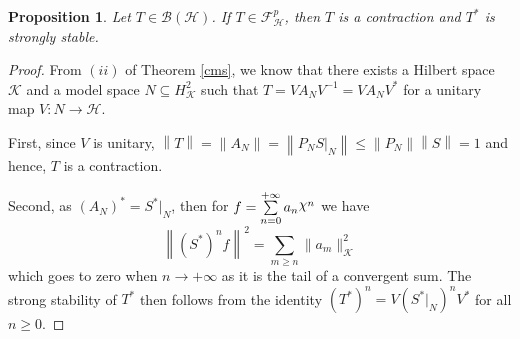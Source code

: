 \documentclass[a4paper,12pt]{amsart}
\def\cF{{\mathcal{F}}}
\def\HH{{\mathcal{H}}}
\def\KK{{\mathcal{K}}}
\def\cF{{\mathcal{F}}}
\DeclareRobustCommand{\rchi}{{\mathpalette\irchi\relax}}
\newcommand{\irchi}[2]{\raisebox{\depth}{$#1\chi$}} %
\newcommand{\norm}[1]{{\left\|{#1}\right\|}}
\newtheorem{proposition}[theorem]{Proposition}
\theoremstyle{definition}
\begin{document}
\begin{proposition}\label{prop:parseval-ida}
Let $T\in\mathcal B(\mathcal H)$. If $T\in\cF^{p}_\HH$, then $T$ is a contraction and $T^*$ is strongly stable.
\end{proposition}
\begin{proof}
 From $(ii)$ of Theorem \ref{cms}, we know that there exists a Hilbert space $\KK$ and a model space $N\subseteq H^2_\KK$ such that $T=VA_NV^{-1}=VA_NV^*$ for a unitary map $V:N\to\HH$. 

First, since $V$ is unitary, $\norm{T}=\norm{A_N}=\norm{P_NS|_N}\leqslant\norm{P_N}\norm{S} = 1$ and hence, $T$ is a contraction. 

Second, as $(A_N)^*=S^*|_N$, then for $f=\sum\limits_{n=0}^{+\infty}a_n\rchi^n$ we have
\begin{equation*}
\norm{(S^*)^nf}^2=\sum\limits_{m\geqslant n}\|a_m\|_\KK^2
\end{equation*}
which goes to zero when $n\to +\infty$ as it is the tail of a convergent sum. The strong stability of $T^*$ then follows from the identity $(T^*)^n=V(S^*|_N)^nV^*$ for all $n\geqslant0$.
\end{proof}
\end{document}
